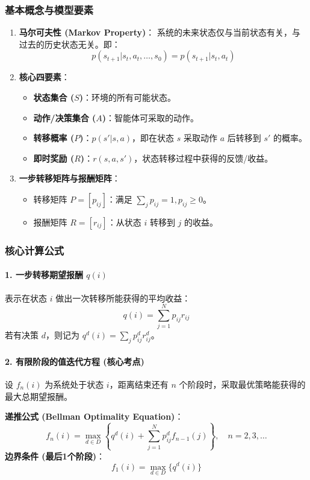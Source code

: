 \documentclass[a4paper,12pt]{ctexart} %
\begin{document}
	\subsubsection{基本概念与模型要素}
	\begin{enumerate}
		\item \textbf{马尔可夫性 (Markov Property)}：
		系统的未来状态仅与当前状态有关，与过去的历史状态无关。即：
		\[ p(s_{t+1}|s_t, a_t, \dots, s_0) = p(s_{t+1}|s_t, a_t) \]
		\item \textbf{核心四要素}：
		\begin{itemize}
			\item \textbf{状态集合 ($S$)}：环境的所有可能状态。
			\item \textbf{动作/决策集合 ($A$)}：智能体可采取的动作。
			\item \textbf{转移概率 ($P$)}：$p(s'|s,a)$，即在状态 $s$ 采取动作 $a$ 后转移到 $s'$ 的概率。
			\item \textbf{即时奖励 ($R$)}：$r(s, a, s')$，状态转移过程中获得的反馈/收益。
		\end{itemize}
		\item \textbf{一步转移矩阵与报酬矩阵}：
		\begin{itemize}
			\item 转移矩阵 $P = [p_{ij}]$：满足 $\sum_{j} p_{ij} = 1, p_{ij} \ge 0$。
			\item 报酬矩阵 $R = [r_{ij}]$：从状态 $i$ 转移到 $j$ 的收益。
		\end{itemize}
	\end{enumerate}
	
	\subsubsection{核心计算公式}
	
	\paragraph{1. 一步转移期望报酬 $q(i)$}
	表示在状态 $i$ 做出一次转移所能获得的平均收益：
	\[
	q(i) = \sum_{j=1}^{N} p_{ij} r_{ij}
	\]
	若有决策 $d$，则记为 $q^d(i) = \sum_{j} p_{ij}^d r_{ij}^d$。
	
	\paragraph{2. 有限阶段的值迭代方程 (核心考点)}
	设 $f_n(i)$ 为系统处于状态 $i$，距离结束还有 $n$ 个阶段时，采取最优策略能获得的最大总期望报酬。
	
	\textbf{递推公式 (Bellman Optimality Equation)}：
	\[
	f_n(i) = \max_{d \in D} \left\{ q^d(i) + \sum_{j=1}^{N} p_{ij}^d f_{n-1}(j) \right\}, \quad n = 2, 3, \dots
	\]
	\textbf{边界条件 (最后1个阶段)}：
	\[
	f_1(i) = \max_{d \in D} \{ q^d(i) \}
	\]
	
\end{document}
